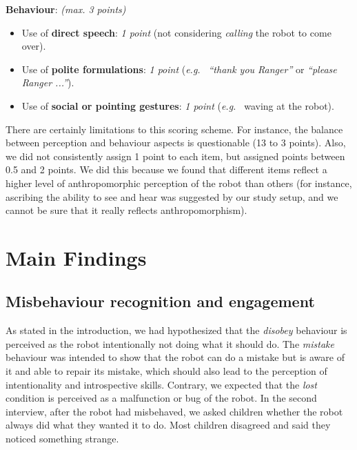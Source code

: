 \documentclass{sig-alternate}
\newcommand{\eg}{{\textit{e.g.~}}}
\begin{document}
\textbf{Behaviour}: \textit{(max. 3 points)}
\begin{itemize}
    \item Use of \textbf{direct speech}: \textit{1 point} (not considering
        \textit{calling} the robot to come over).

    \item Use of \textbf{polite formulations}: \textit{1 point} (\eg
        \textit{``thank you Ranger''} or \textit{``please Ranger ...''}).

    \item Use of \textbf{social or pointing gestures}: \textit{1 point} (\eg
        waving at the robot).

\end{itemize}

There are certainly limitations to this scoring scheme. For instance, the
balance between perception and behaviour aspects is questionable (13 to 3
points). Also, we did not consistently assign 1 point to each item, but assigned
points between 0.5 and 2 points. We did this because we found that different
items reflect a higher level of anthropomorphic perception of the robot than
others (for instance, ascribing the ability to see and hear was suggested by our
study setup, and we cannot be sure that it really reflects anthropomorphism).

\section{Main Findings}

\subsection{Misbehaviour recognition and engagement}

As stated in the introduction, we had hypothesized that the \textit{disobey}
behaviour is perceived as the robot intentionally not doing what it should do.
The \textit{mistake} behaviour was intended to show that the robot can do a
mistake but is aware of it and able to repair its mistake, which should also
lead to the perception of intentionality and introspective skills.  Contrary, we expected that the
\textit{lost} condition is perceived as a malfunction or bug of the robot.  In
the second interview, after the robot had misbehaved, we asked children whether
the robot always did what they wanted it to do. Most children disagreed and said
they noticed something strange.
\end{document}
